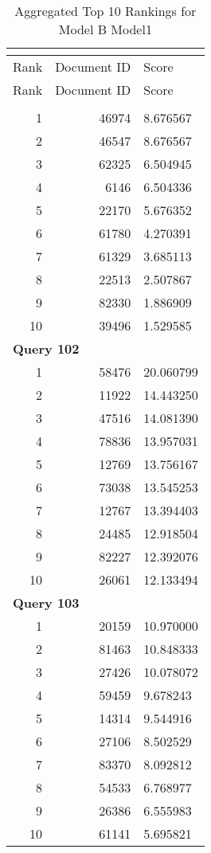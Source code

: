 \begin{longtable}[{p}]{@{}rrp{}@{}}
\caption{Aggregated Top 10 Rankings for Model B Model1} {\label{tab:aggregated_BModel1}}\\
\toprule
Rank & Document ID & Score \\
\midrule
\endfirsthead
\toprule
Rank & Document ID & Score \\
\midrule
\endhead
\endfoot
\bottomrule
\endlastfoot
\multicolumn{3}{l}{\bfseries Query 101} \\
1 & 46974 & 8.676567 \\
2 & 46547 & 8.676567 \\
3 & 62325 & 6.504945 \\
4 & 6146 & 6.504336 \\
5 & 22170 & 5.676352 \\
6 & 61780 & 4.270391 \\
7 & 61329 & 3.685113 \\
8 & 22513 & 2.507867 \\
9 & 82330 & 1.886909 \\
10 & 39496 & 1.529585 \\
\midrule
\multicolumn{3}{l}{\bfseries Query 102} \\
1 & 58476 & 20.060799 \\
2 & 11922 & 14.443250 \\
3 & 47516 & 14.081390 \\
4 & 78836 & 13.957031 \\
5 & 12769 & 13.756167 \\
6 & 73038 & 13.545253 \\
7 & 12767 & 13.394403 \\
8 & 24485 & 12.918504 \\
9 & 82227 & 12.392076 \\
10 & 26061 & 12.133494 \\
\midrule
\multicolumn{3}{l}{\bfseries Query 103} \\
1 & 20159 & 10.970000 \\
2 & 81463 & 10.848333 \\
3 & 27426 & 10.078072 \\
4 & 59459 & 9.678243 \\
5 & 14314 & 9.544916 \\
6 & 27106 & 8.502529 \\
7 & 83370 & 8.092812 \\
8 & 54533 & 6.768977 \\
9 & 26386 & 6.555983 \\
10 & 61141 & 5.695821 \\

\end{longtable}

